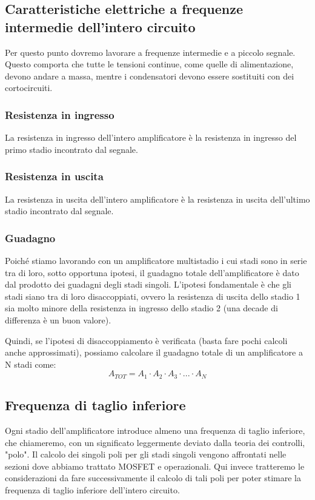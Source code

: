 \documentclass[a4paper,twocolumn,notitlepage]{book}
\begin{document}
	\subsection*{Caratteristiche elettriche a frequenze intermedie dell'intero circuito}
	Per questo punto dovremo lavorare a frequenze intermedie e a piccolo segnale. Questo comporta che tutte le tensioni continue, come quelle di alimentazione, devono andare a massa, mentre i condensatori devono essere sostituiti con dei cortocircuiti.\
	
	\subsubsection*{Resistenza in ingresso}
	La resistenza in ingresso dell'intero amplificatore è la resistenza in ingresso del primo stadio incontrato dal segnale.
	\subsubsection*{Resistenza in uscita}
	La resistenza in uscita dell'intero amplificatore è la resistenza in uscita dell'ultimo stadio incontrato dal segnale.
	\subsubsection*{Guadagno}
	Poiché stiamo lavorando con un amplificatore multistadio i cui stadi sono in serie tra di loro, sotto opportuna ipotesi, il guadagno totale dell'amplificatore è dato dal prodotto dei guadagni degli stadi singoli.
	L'ipotesi fondamentale è che gli stadi siano tra di loro disaccoppiati, ovvero la resistenza di uscita dello stadio 1 sia molto minore della resistenza in ingresso dello stadio 2 (una decade di differenza è un buon valore).
	
	Quindi, se l'ipotesi di disaccoppiamento è verificata (basta fare pochi calcoli anche approssimati), possiamo calcolare il guadagno totale di un amplificatore a N stadi come:
	\begin{equation}
		A_{TOT}=A_1 \cdot A_2 \cdot A_3 \cdot...\cdot A_N
	\end{equation}
	
	\subsection*{Frequenza di taglio inferiore}
	Ogni stadio dell'amplificatore introduce almeno una frequenza di taglio inferiore, che chiameremo, con un significato leggermente deviato dalla teoria dei controlli, "polo". Il calcolo dei singoli poli per gli stadi singoli vengono affrontati nelle sezioni dove abbiamo trattato MOSFET e operazionali. Qui invece tratteremo le considerazioni da fare successivamente il calcolo di tali poli per poter stimare la frequenza di taglio inferiore dell'intero circuito.
	
\end{document}
